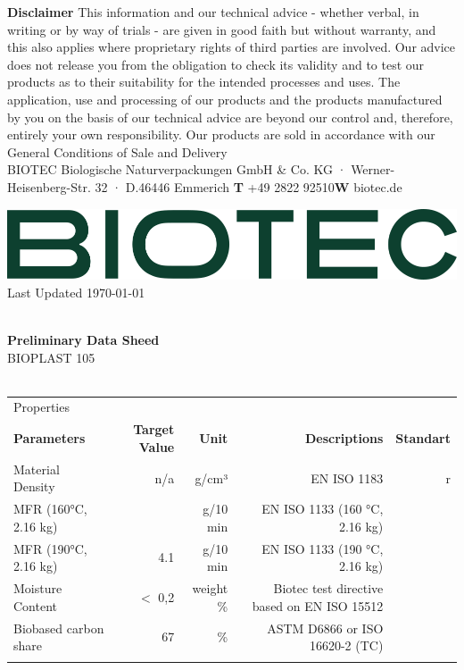 \documentclass{article}
\begin{document}
\vspace*{\fill}
{\scriptsize
        \textbf{Disclaimer} This information and our technical advice - whether verbal, in writing or by way of trials - are given in good faith but without warranty, and this also applies where proprietary rights of third parties are involved. Our advice does not release you from the obligation to check its validity and to test our products as to their suitability for the intended processes and uses. The application, use and processing of our products and the products manufactured by you on the basis of our technical advice are beyond our control and, therefore, entirely your own responsibility. Our products are sold in accordance with our General Conditions of Sale and Delivery \\ 
 BIOTEC Biologische Naturverpackungen GmbH \& Co. KG · Werner-Heisenberg-Str. 32 · D.46446 Emmerich \hfill \textbf{T} +49 2822 92510\qquad \textbf{W} biotec.de}
\clearpage
\begin{flushleft}
\includegraphics[scale=0.20]{biotec}
\hfill\tiny Last Updated \today
\end{flushleft}
\begin{flushleft}
\hspace{1cm}\\
\textbf{Preliminary Data Sheed}\\
BIOPLAST 105\\
\hspace{1cm}\\
\end{flushleft}
\begin{center}
\begin{tabularx}
{\textwidth}{X r  r  r  r }\rowcolor{color_title}Properties &  &  &  &  \\
\textbf{Parameters} & \textbf{Target Value} & \textbf{Unit} & \textbf{Descriptions} & \textbf{Standart} \\
Material Density  & n/a & g/cm³ & EN ISO 1183 & r \\
\arrayrulecolor{line_color}\hline
MFR (160°C, 2.16 kg) &   & g/10 min & EN ISO 1133 (160 °C, 2.16 kg) &  \\
\arrayrulecolor{line_color}\hline
MFR (190°C, 2.16 kg) & 4.1 & g/10 min & EN ISO 1133 (190 °C, 2.16 kg) &  \\
\arrayrulecolor{line_color}\hline
Moisture Content & \(<\) 0,2 & weight \% & Biotec test directive based on EN ISO 15512 &  \\
\arrayrulecolor{line_color}\hline
Biobased carbon share & 67 & \% & ASTM D6866 or ISO 16620-2 (TC) &  \\
\arrayrulecolor{line_color}\hline

\end{tabularx}
\end{center}
\end{document}

